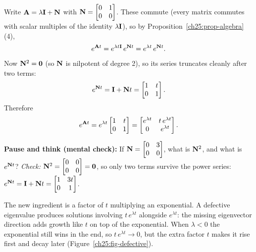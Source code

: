Write $\mathbf{A} = \lambda\mathbf{I} + \mathbf{N}$ with $\mathbf{N}=\begin{bmatrix}0&1\\0&0
\end{bmatrix}$. These commute (every matrix commutes with scalar multiples of the
identity $\lambda\mathbf{I}$), so by Proposition~\ref{ch25:prop-algebra}(4),
\[
  e^{\mathbf{A}t} = e^{\lambda t\mathbf{I}}\, e^{\mathbf{N}t}
  = e^{\lambda t}\, e^{\mathbf{N}t}.
\]
Now $\mathbf{N}^2 = \mathbf{0}$ (so $\mathbf{N}$ is nilpotent of degree 2), so its series
truncates cleanly after two terms:
\[
  e^{\mathbf{N}t} = \mathbf{I} + \mathbf{N}t = \begin{bmatrix}1 & t\\ 0 & 1\end{bmatrix}.
\]
Therefore
\[
  e^{\mathbf{A}t} = e^{\lambda t}\begin{bmatrix}1 & t\\ 0 & 1\end{bmatrix}
  = \begin{bmatrix}e^{\lambda t} & t\,e^{\lambda t}\\ 0 & e^{\lambda t}\end{bmatrix}.
\]

\begin{recoverybox}
\textbf{Pause and think (mental check):} If $\mathbf{N} = \begin{bmatrix} 0 & 3 \\ 0 & 0 \end{bmatrix}$, what is $\mathbf{N}^2$, and what is $e^{\mathbf{N}t}$?
\emph{Check:} $\mathbf{N}^2 = \begin{bmatrix}0&0\\0&0\end{bmatrix} = \mathbf{0}$, so only two terms survive the power series:
$e^{\mathbf{N}t} = \mathbf{I} + \mathbf{N}t = \begin{bmatrix} 1 & 3t \\ 0 & 1 \end{bmatrix}$.
\end{recoverybox}

The new ingredient is a factor of $t$ multiplying an exponential. A
defective eigenvalue produces solutions involving $t\,e^{\lambda t}$ alongside
$e^{\lambda t}$: the missing eigenvector direction adds growth like $t$ on top
of the exponential. When $\lambda<0$ the exponential still wins in the end, so
$t\,e^{\lambda t}\to 0$, but the extra factor $t$ makes it rise first and decay
later (Figure~\ref{ch25:fig-defective}).

